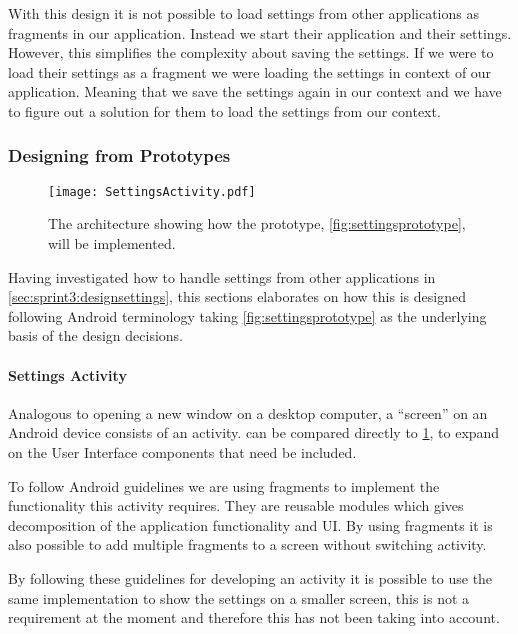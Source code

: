 With this design it is not possible to load settings from other applications as fragments in our application. Instead we start their application and their settings.
However, this simplifies the complexity about saving the settings.
If we were to load their settings as a fragment we were loading the settings in context of our application. 
Meaning that we save the settings again in our context and we have to figure out a solution for them to load the settings from our context.

\subsubsection{Designing from Prototypes}

\begin{figure}[h]
\centering
\texttt{[image: SettingsActivity.pdf]}
\caption{The architecture showing how the prototype, \cref{fig:settingsprototype}, will be implemented.}
\label{fig:settingsarchitecture}
\end{figure}

Having investigated how to handle settings from other \giraf applications in \cref{sec:sprint3:designsettings}, this sections elaborates on how this is designed following Android terminology taking \cref{fig:settingsprototype} as the underlying basis of the design decisions.

\paragraph{Settings Activity}
Analogous to opening a new window on a desktop computer, a ``screen'' on an Android device consists of an activity.
 can be compared directly to \cref{fig:settingsarchitecture}, to expand on the User Interface components that need be included.

To follow Android guidelines we are using fragments\cite{fragments} to implement the functionality this activity requires. They are reusable modules which gives decomposition of the application functionality and UI. By using fragments it is also possible to add multiple fragments to a screen without switching activity.

By following these guidelines for developing an activity it is possible to use the same implementation to show the settings on a smaller screen, this is not a requirement at the moment and therefore this has not been taking into account.\\

